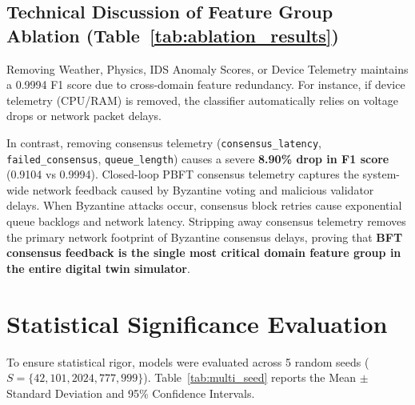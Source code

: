 \documentclass[conference]{IEEEtran}
\begin{document}
\subsection{Technical Discussion of Feature Group Ablation (Table~\ref{tab:ablation_results})}
\label{subsec:ablation_discussion}

Removing Weather, Physics, IDS Anomaly Scores, or Device Telemetry maintains a 0.9994 F1 score due to cross-domain feature redundancy. For instance, if device telemetry (CPU/RAM) is removed, the classifier automatically relies on voltage drops or network packet delays.

In contrast, removing consensus telemetry (\texttt{consensus\_latency}, \texttt{failed\_consensus}, \texttt{queue\_length}) causes a severe \textbf{8.90\% drop in F1 score} (0.9104 vs 0.9994). Closed-loop PBFT consensus telemetry captures the system-wide network feedback caused by Byzantine voting and malicious validator delays. When Byzantine attacks occur, consensus block retries cause exponential queue backlogs and network latency. Stripping away consensus telemetry removes the primary network footprint of Byzantine consensus delays, proving that \textbf{BFT consensus feedback is the single most critical domain feature group in the entire digital twin simulator}.

\section{Statistical Significance Evaluation}
\label{sec:multi_seed}

To ensure statistical rigor, models were evaluated across 5 random seeds ($S = \{42, 101, 2024, 777, 999\}$). Table~\ref{tab:multi_seed} reports the Mean $\pm$ Standard Deviation and 95\% Confidence Intervals.

\begin{table}[htbp]
\caption{5-Seed Statistical Significance Evaluation (Mean $\pm$ Std \& 95\% CI)}
\label{tab:multi_seed}
\centering
{}
\end{table}
\end{document}
